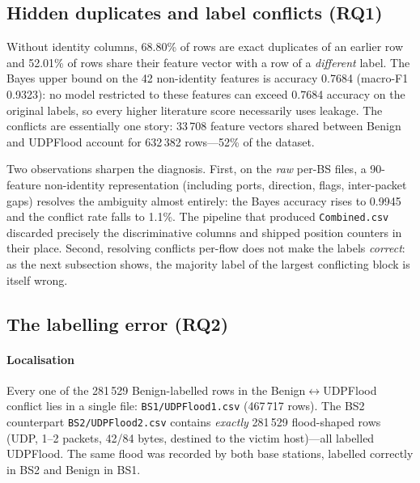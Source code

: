 \documentclass[preprint,12pt]{elsarticle}
\begin{document}
\subsection{Hidden duplicates and label conflicts (RQ1)}
\label{sec:conflicts}

Without identity columns, 68.80\% of rows are exact duplicates of an earlier
row and 52.01\% of rows share their feature vector with a row of a
\emph{different} label. The Bayes upper bound on the 42 non-identity features is
accuracy 0.7684 (macro-F1 0.9323): no model restricted to these features can
exceed 0.7684 accuracy on the original labels, so every higher literature score
necessarily uses leakage. The conflicts are essentially one story:
33\,708 feature vectors shared between Benign and UDPFlood account for
632\,382 rows---52\% of the dataset.

Two observations sharpen the diagnosis. First, on the \emph{raw} per-BS files,
a 90-feature non-identity representation (including ports, direction, flags,
inter-packet gaps) resolves the ambiguity almost entirely: the Bayes accuracy
rises to 0.9945 and the conflict rate falls to 1.1\%. The pipeline that
produced \texttt{Combined.csv} discarded precisely the discriminative columns
and shipped position counters in their place. Second, resolving conflicts
per-flow does not make the labels \emph{correct}: as the next subsection shows,
the majority label of the largest conflicting block is itself wrong.

\subsection{The labelling error (RQ2)}
\label{sec:error}

\paragraph{Localisation} Every one of the 281\,529 Benign-labelled rows in the
Benign$\leftrightarrow$UDPFlood conflict lies in a single file:
\texttt{BS1/UDPFlood1.csv} (467\,717 rows). The BS2 counterpart
\texttt{BS2/UDPFlood2.csv} contains \emph{exactly} 281\,529 flood-shaped rows
(UDP, 1--2 packets, 42/84 bytes, destined to the victim host)---all labelled
UDPFlood. The same flood was recorded by both base stations, labelled correctly
in BS2 and Benign in BS1.
\end{document}
